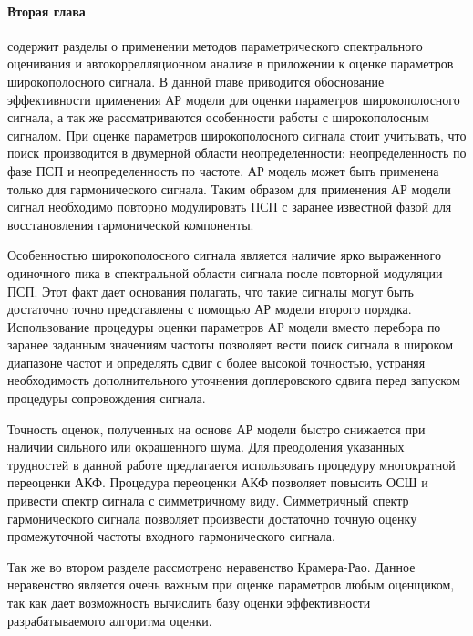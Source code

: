 \paragraph{Вторая глава} содержит разделы о применении методов параметрического спектрального оценивания и автокоррелляционном анализе в приложении к оценке
параметров широкополосного сигнала. В данной главе приводится обоснование эффективности применения АР модели для оценки параметров широкополосного сигнала,
а так же рассматриваются особенности работы с широкополосным сигналом. При оценке параметров широкополосного сигнала стоит учитывать,
что поиск производится в двумерной области неопределенности: неопределенность по фазе ПСП и неопределенность по частоте.
АР модель может быть применена только для гармонического сигнала. Таким образом для применения АР модели сигнал необходимо повторно модулировать ПСП
с заранее известной фазой для восстановления гармонической компоненты.

Особенностью широкополосного сигнала является наличие ярко выраженного одиночного пика в спектральной области сигнала после повторной модуляции ПСП. 
Этот факт дает основания полагать, что такие сигналы могут быть достаточно точно представлены с помощью АР модели второго порядка.
Использование процедуры оценки параметров АР модели вместо перебора по заранее заданным значениям частоты позволяет вести поиск сигнала
в широком диапазоне частот и определять сдвиг с более высокой точностью, устраняя необходимость дополнительного уточнения
доплеровского сдвига перед запуском процедуры сопровождения сигнала.

Точность оценок, полученных на основе АР модели быстро снижается при наличии сильного или окрашенного шума. Для преодоления указанных
трудностей в данной работе предлагается использовать процедуру многократной переоценки АКФ. Процедура переоценки АКФ позволяет
повысить ОСШ и привести спектр сигнала с симметричному виду. Симметричный спектр гармонического сигнала позволяет произвести
достаточно точную оценку промежуточной частоты входного гармонического сигнала.

Так же во втором разделе рассмотрено неравенство Крамера-Рао. Данное неравенство является очень важным при оценке параметров любым
оценщиком, так как дает возможность вычислить базу оценки эффективности разрабатываемого алгоритма оценки.

